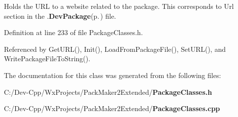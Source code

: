 Holds the URL to a website related to the package. This corresponds to Url section in the .{\bf Dev\-Package}{\rm (p.\,\pageref{class_dev_package})} file. 

Definition at line 233 of file Package\-Classes.h.

Referenced by Get\-URL(), Init(), Load\-From\-Package\-File(), Set\-URL(), and Write\-Package\-File\-To\-String().

The documentation for this class was generated from the following files:\begin{CompactItemize}
\item 
C:/Dev-Cpp/Wx\-Projects/Pack\-Maker2Extended/{\bf Package\-Classes.h}\item 
C:/Dev-Cpp/Wx\-Projects/Pack\-Maker2Extended/{\bf Package\-Classes.cpp}\end{CompactItemize}
